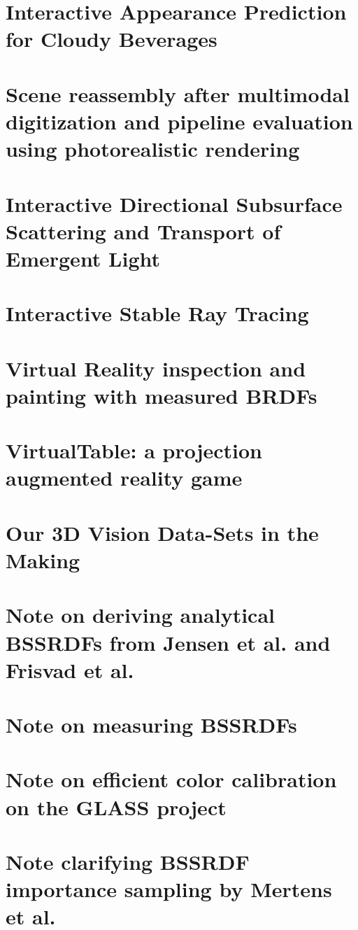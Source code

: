 \chapter{Interactive Appearance Prediction for Cloudy Beverages}
\label{sec:juice}
\label{sec:firstcontribution}

%
\chapter{Scene reassembly after multimodal digitization and pipeline evaluation using photorealistic rendering}
\label{sec:glass}

%
\chapter{Interactive Directional Subsurface Scattering and Transport of Emergent Light}
\label{sec:interactivedirsss}

%
\chapter{Interactive Stable Ray Tracing}
\label{sec:srt}

%
\chapter{Virtual Reality inspection and painting with measured BRDFs}
\label{sec:vrbrdf}
\label{sec:lastcontribution}

%
\chapter{VirtualTable: a projection augmented reality game}
\label{sec:virtualtable}

%
\chapter{Our 3D Vision Data-Sets in the Making}
\label{sec:robdataset}

%
\chapter{Note on deriving analytical BSSRDFs from Jensen et al. and Frisvad et al.}
\label{sec:jensennote}

%
\chapter{Note on measuring BSSRDFs}
\label{sec:bssrdfnote}

%
\chapter{Note on efficient color calibration on the GLASS project}
\label{sec:colornote}

%
\chapter{Note clarifying BSSRDF importance sampling by Mertens et al.}
\label{sec:mertensnote}


